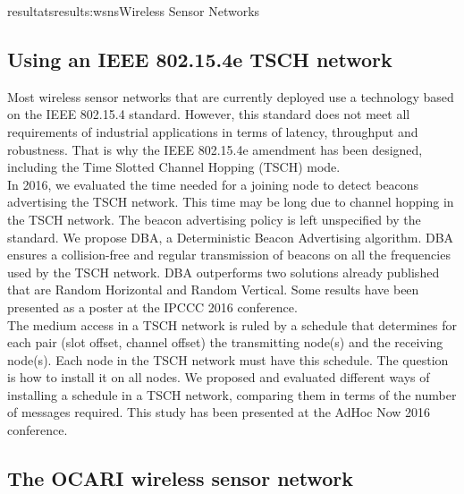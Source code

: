 \documentclass{ra2016}
\begin{document}
\begin{module}{resultats}{results:wsns}{Wireless Sensor Networks}
\subsection{Using an IEEE 802.15.4e TSCH network}
 \begin{participants}
\end{participants}  

Most wireless sensor networks that are currently deployed use a technology based on the IEEE 802.15.4 standard. However, this standard does not meet all requirements of industrial applications in terms of latency, throughput and robustness. That is why the IEEE 802.15.4e amendment has been designed, including the Time Slotted Channel Hopping (TSCH) mode. \\

In 2016, we evaluated the time needed for a joining node to detect beacons advertising the TSCH network. This time may be long due to channel hopping in the TSCH network. The beacon advertising policy is left unspecified by the standard. We propose DBA, a Deterministic Beacon Advertising algorithm. DBA ensures a collision-free and regular transmission of beacons on all the frequencies used by the TSCH network. DBA outperforms two solutions already published that are Random Horizontal and Random Vertical. Some results have been presented as a poster at the IPCCC 2016 conference.\\

The medium access in a TSCH network is ruled by a schedule that determines for each pair (slot offset, channel offset) the transmitting node(s) and the receiving node(s). Each node in the TSCH network must have this schedule. The question is how to install it on all nodes. We proposed and evaluated different ways of installing a schedule in a TSCH network, comparing them in terms of the number of messages required. This study has been presented at the AdHoc Now 2016 conference.\\

\subsection{The OCARI wireless sensor network}
 \begin{participants}
\end{participants}  


\end{module}
\end{document}
